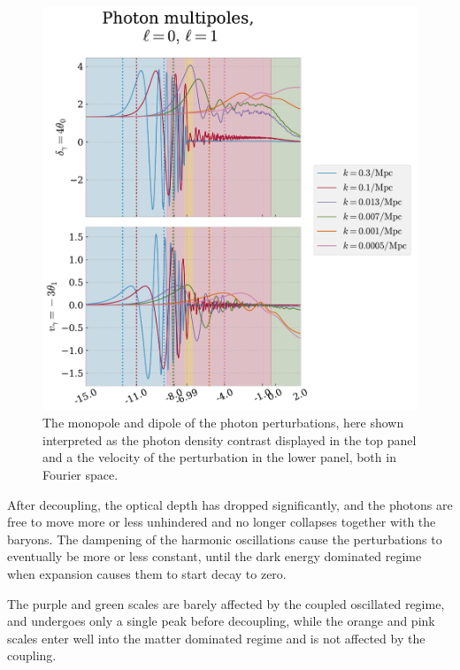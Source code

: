 \documentclass[10pt,a4paper]{article}
\begin{document}
\begin{figure}[ht!]
  \centering
  \includegraphics[scale=0.5]{../figs/multipole_pert.pdf}
  \caption{The monopole and dipole of the photon perturbations, here shown interpreted as the photon density contrast displayed in the top panel and a the velocity of the perturbation in the lower panel, both in Fourier space.}
  \label{fig:Photon pert}
\end{figure}

After decoupling, the optical depth has dropped significantly, and the photons are free to move more or less unhindered and no longer collapses together with the baryons. The dampening of the harmonic oscillations cause the perturbations to eventually be more or less constant, until the dark energy dominated regime when expansion causes them to start decay to zero.

The purple and green scales are barely affected by the coupled oscillated regime, and undergoes only a single peak before decoupling, while the orange and pink scales enter well into the matter dominated regime and is not affected by the coupling.
\end{document}
